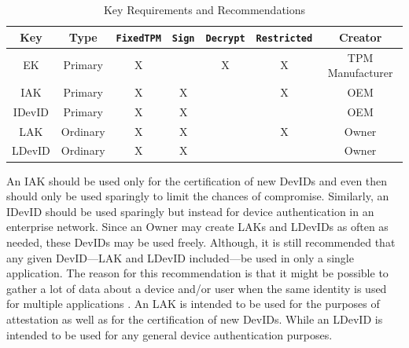 \begin{table}[h]
  \begin{center}
    \scriptsize 
    \sffamily
    \renewcommand{\arraystretch}{1.5}
    \begin{tabular}{ |c|c|c|c|c|c|c| }
      \hline
      Key & Type & \verb|FixedTPM| & \verb|Sign| & \verb|Decrypt| & \verb|Restricted| & Creator \\
      \hline
      \hline
      EK & Primary       & X &   & X & X & TPM Manufacturer \\
      \hline
      IAK & Primary      & X & X &   & X & OEM \\
      \hline
      IDevID & Primary   & X & X &   &   & OEM \\
      \hline
      LAK & Ordinary     & X & X &   & X & Owner \\
      \hline
      LDevID & Ordinary  & X & X &   &   & Owner \\
      \hline
    \end{tabular}
    \caption{Key Requirements and Recommendations}
    \label{fig:req_and_recs}
  \end{center}
\end{table}

 
 An IAK should be used only for the certification of new DevIDs and even then should only be used sparingly to limit the chances of compromise. Similarly, an IDevID should be used sparingly but instead for device authentication in an enterprise network. Since an Owner may create LAKs and LDevIDs as often as needed, these DevIDs may be used freely. Although, it is still recommended that any given DevID---LAK and LDevID included---be used in only a single application. The reason for this recommendation is that it might be possible to gather a lot of data about a device and/or user when the same identity is used for multiple applications \cite{KeyManagement}. An LAK is intended to be used for the purposes of attestation as well as for the certification of new DevIDs. While an LDevID is intended to be used for any general device authentication purposes.

